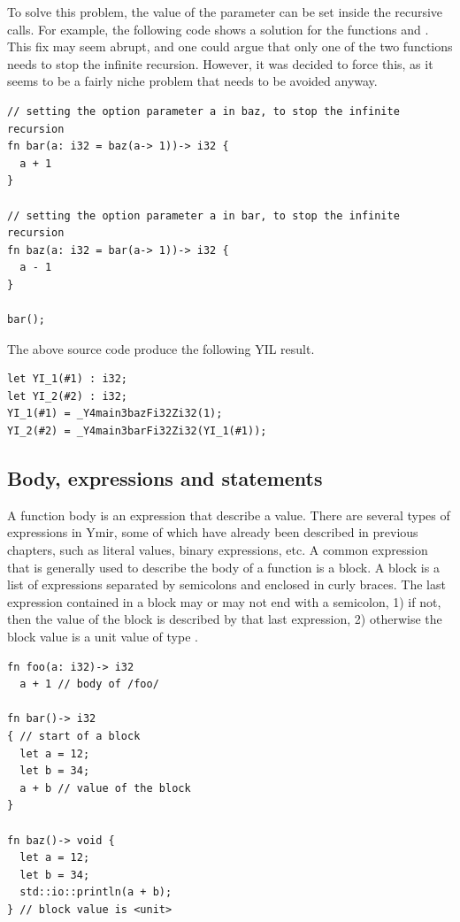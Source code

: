 To solve this problem, the value of the parameter  can be set inside
the recursive calls. For example, the following code shows a solution for the
functions  and . This fix may seem abrupt, and one could
argue that only one of the two functions needs to stop the infinite recursion.
However, it was decided to force this, as it seems to be a fairly niche problem
that needs to be avoided anyway.

\begin{lstlisting}[style=coloredverbatim]
// setting the option parameter a in baz, to stop the infinite recursion
fn bar(a: i32 = baz(a-> 1))-> i32 {
  a + 1
}

// setting the option parameter a in bar, to stop the infinite recursion
fn baz(a: i32 = bar(a-> 1))-> i32 {
  a - 1
}

bar();
\end{lstlisting}

The above source code produce the following YIL result.

\begin{lstlisting}[style=lyilVerb]
let YI_1(#1) : i32;
let YI_2(#2) : i32;
YI_1(#1) = _Y4main3bazFi32Zi32(1);
YI_2(#2) = _Y4main3barFi32Zi32(YI_1(#1));
\end{lstlisting}

\subsection {Body, expressions and statements}
\label{sec:function_body}

A function body is an expression that describe a value. There are several types
of expressions in Ymir, some of which have already been described in previous
chapters, such as literal values, binary expressions, etc. A common expression
that is generally used to describe the body of a function is a block. A block is
a list of expressions separated by semicolons and enclosed in curly braces. The
last expression contained in a block may or may not end with a semicolon, 1) if
not, then the value of the block is described by that last expression, 2)
otherwise the block value is a unit value of type .

\begin{lstlisting}[style=coloredverbatim]
fn foo(a: i32)-> i32
  a + 1 // body of /foo/

fn bar()-> i32
{ // start of a block
  let a = 12;
  let b = 34;
  a + b // value of the block
}

fn baz()-> void {
  let a = 12;
  let b = 34;
  std::io::println(a + b);
} // block value is <unit>

\end{lstlisting}

